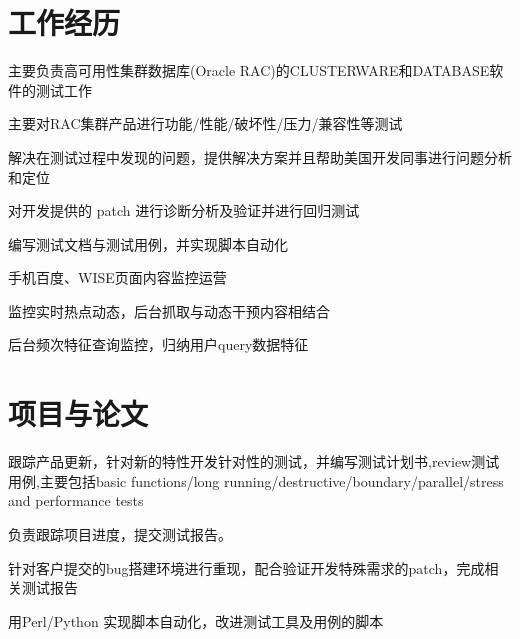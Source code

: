 \documentclass[]{deedy-resume-openfont}
\begin{document}
\begin{minipage}[t]{0.73\textwidth} 


\section{工作经历}
\sectionsep
{}
\vspace{\topsep}
\begin{tightemize}
    \item 主要负责高可⽤性集群数据库(Oracle RAC)的CLUSTERWARE和DATABASE软件的测试工作
    \item 主要对RAC集群产品进行功能/性能/破坏性/压力/兼容性等测试
    \item 解决在测试过程中发现的问题，提供解决⽅案并且帮助美国开发同事进行问题分析和定位
    \item 对开发提供的 patch 进⾏诊断分析及验证并进⾏回归测试
    \item 编写测试文档与测试用例，并实现脚本自动化
\end{tightemize}
\sectionsep

\begin{tightemize}
\item ⼿机百度、WISE⻚面内容监控运营
\item 监控实时热点动态，后台抓取与动态⼲预内容相结合
\item 后台频次特征查询监控，归纳用户query数据特征
\end{tightemize}
\sectionsep


\section{项目与论文}
\sectionsep
{}
\begin{tightemize}
    \item 跟踪产品更新，针对新的特性开发针对性的测试，并编写测试计划书,review测试⽤例,主要包括basic functions/long running/destructive/boundary/parallel/stress and performance tests
    \item 负责跟踪项⽬进度，提交测试报告。
    \item 针对客户提交的bug搭建环境进⾏重现，配合验证开发特殊需求的patch，完成相关测试报告
    \item ⽤Perl/Python 实现脚本⾃动化，改进测试⼯具及用例的脚本
    \end{tightemize}
\sectionsep


\end{minipage}
\end{document}
